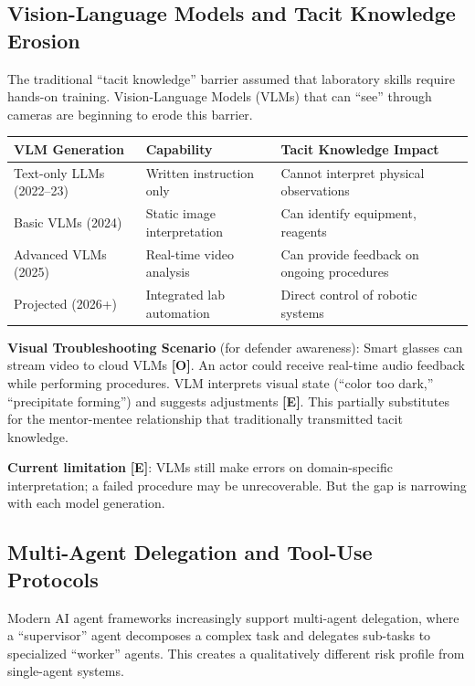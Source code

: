 \documentclass[11pt,letterpaper]{article}
\begin{document}
\subsection{Vision-Language Models and Tacit Knowledge Erosion}

The traditional ``tacit knowledge'' barrier assumed that laboratory skills require hands-on training. Vision-Language Models (VLMs) that can ``see'' through cameras are beginning to erode this barrier.

\begin{center}
\small
\begin{tabular}{L{3.5cm}L{4cm}L{4.5cm}}
\toprule
\textbf{VLM Generation} & \textbf{Capability} & \textbf{Tacit Knowledge Impact} \\
\midrule
Text-only LLMs (2022--23) & Written instruction only & Cannot interpret physical observations \\
Basic VLMs (2024) & Static image interpretation & Can identify equipment, reagents \\
Advanced VLMs (2025) & Real-time video analysis & Can provide feedback on ongoing procedures \\
Projected (2026+) & Integrated lab automation & Direct control of robotic systems \\
\bottomrule
\end{tabular}
\end{center}

\textbf{Visual Troubleshooting Scenario} (for defender awareness): Smart glasses can stream video to cloud VLMs \textbf{[O]}. An actor could receive real-time audio feedback while performing procedures. VLM interprets visual state (``color too dark,'' ``precipitate forming'') and suggests adjustments \textbf{[E]}. This partially substitutes for the mentor-mentee relationship that traditionally transmitted tacit knowledge.

\textbf{Current limitation} \textbf{[E]}: VLMs still make errors on domain-specific interpretation; a failed procedure may be unrecoverable. But the gap is narrowing with each model generation.

\subsection{Multi-Agent Delegation and Tool-Use Protocols}

Modern AI agent frameworks increasingly support multi-agent delegation, where a ``supervisor'' agent decomposes a complex task and delegates sub-tasks to specialized ``worker'' agents. This creates a qualitatively different risk profile from single-agent systems.
\end{document}
